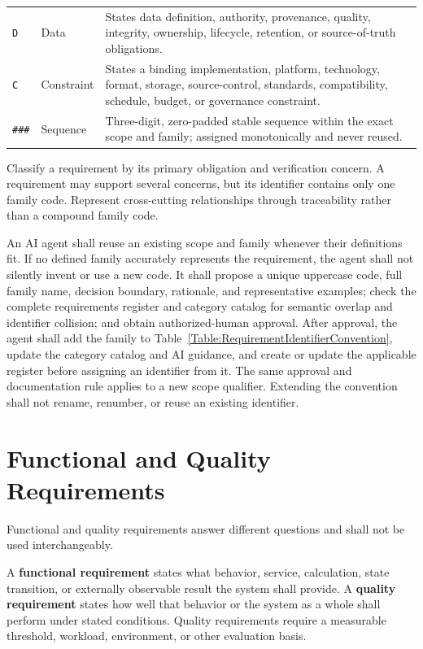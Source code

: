 \begin{tabularx}{\linewidth}{L{2.0cm}L{3.5cm}Y}
\texttt{D} & Data & States data definition, authority, provenance, quality, integrity, ownership, lifecycle, retention, or source-of-truth obligations.\\
\texttt{C} & Constraint & States a binding implementation, platform, technology, format, storage, source-control, standards, compatibility, schedule, budget, or governance constraint.\\
\texttt{\#\#\#} & Sequence & Three-digit, zero-padded stable sequence within the exact scope and family; assigned monotonically and never reused.\\
\bottomrule
\end{tabularx}
\normalsize

Classify a requirement by its primary obligation and verification concern. A
requirement may support several concerns, but its identifier contains only one
family code. Represent cross-cutting relationships through traceability rather
than a compound family code.

An AI agent shall reuse an existing scope and family whenever their definitions
fit. If no defined family accurately represents the requirement, the agent
shall not silently invent or use a new code. It shall propose a unique uppercase
code, full family name, decision boundary, rationale, and representative
examples; check the complete requirements register and category catalog for
semantic overlap and identifier collision; and obtain authorized-human
approval. After approval, the agent shall add the family to
Table~\ref{Table:RequirementIdentifierConvention}, update the category catalog
and AI guidance, and create or update the applicable register before assigning
an identifier from it. The same approval and documentation rule applies to a
new scope qualifier. Extending the convention shall not rename, renumber, or
reuse an existing identifier.

\section{Functional and Quality Requirements}
Functional and quality requirements answer different questions and shall not be
used interchangeably.

\begin{DevFTDI245RNote}
A \textbf{functional requirement} states what behavior, service, calculation,
state transition, or externally observable result the system shall provide. A
\textbf{quality requirement} states how well that behavior or the system as a
whole shall perform under stated conditions. Quality requirements require a
measurable threshold, workload, environment, or other evaluation basis.
\end{DevFTDI245RNote}

